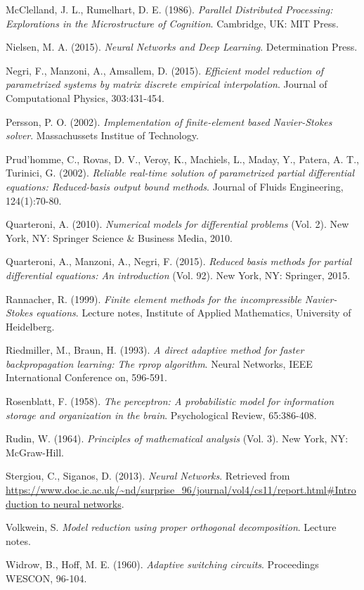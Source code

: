 \documentclass[12pt, a4paper, twoside, openright]{report}
\numberwithin{equation}{chapter}
\theoremstyle{theorem}
\theoremstyle{definition}
\theoremstyle{remark}
\theoremstyle{proposition}
\numberwithin{figure}{chapter}
\begin{document}
\begin{thebibliography}{50}
		McClelland, J. L., Rumelhart, D. E. (1986). \emph{Parallel Distributed Processing: Explorations in the Microstructure of Cognition}. Cambridge, UK: MIT Press.
		
		Nielsen, M. A. (2015). \emph{Neural Networks and Deep Learning}. Determination Press.
				
		Negri, F., Manzoni, A., Amsallem, D. (2015). \emph{Efficient model reduction of parametrized systems by matrix discrete empirical interpolation}. Journal of Computational Physics, 303:431-454.
		
		Persson, P. O. (2002). \emph{Implementation of finite-element based Navier-Stokes solver}. Massachussets Institue of Technology.
		
		Prud'homme, C., Rovas, D. V., Veroy, K., Machiels, L., Maday, Y., Patera, A. T., Turinici, G. (2002). \emph{Reliable real-time solution of parametrized partial differential equations: Reduced-basis output bound methods}. Journal of Fluids Engineering, 124(1):70-80.
		
		Quarteroni, A. (2010). \emph{Numerical models for differential problems} (Vol. 2). New York, NY: Springer Science \& Business Media, 2010.
		
		Quarteroni, A., Manzoni, A., Negri, F. (2015). \emph{Reduced basis methods for partial differential equations: An introduction} (Vol. 92). New York, NY: Springer, 2015.
		
		Rannacher, R. (1999). \emph{Finite element methods for the incompressible Navier-Stokes equations}. Lecture notes, Institute of Applied Mathematics, University of Heidelberg.
		
		Riedmiller, M., Braun, H. (1993). \emph{A direct adaptive method for faster backpropagation learning: The rprop algorithm}. Neural Networks, IEEE International Conference on, 596-591.
		
		Rosenblatt, F. (1958). \emph{The perceptron: A probabilistic model for information storage and organization in the brain}. Psychological Review, 65:386-408.
		
		Rudin, W. (1964). \emph{Principles of mathematical analysis} (Vol. 3). New York, NY: McGraw-Hill.
		
		Stergiou, C., Siganos, D. (2013). \emph{Neural Networks}. Retrieved from \url{https://www.doc.ic.ac.uk/~nd/surprise_96/journal/vol4/cs11/report.html#Introduction to neural networks}.
		
		Volkwein, S. \emph{Model reduction using proper orthogonal decomposition}. Lecture notes.
		
		Widrow, B., Hoff, M. E. (1960). \emph{Adaptive switching circuits}. Proceedings WESCON, 96-104.
		
	\end{thebibliography}	
	
\end{document}
